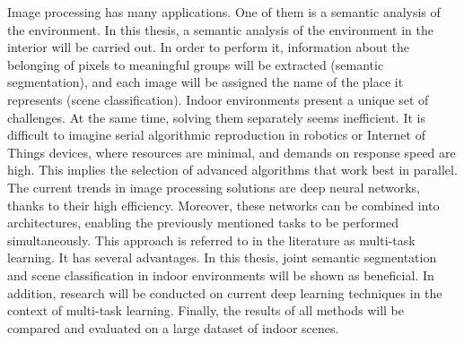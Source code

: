 Image processing has many applications. One of them is a semantic analysis of the environment. In this thesis, a semantic analysis of the environment in the interior will be carried out. In order to perform it, information about the belonging of pixels to meaningful groups will be extracted (semantic segmentation), and each image will be assigned the name of the place it represents (scene classification). Indoor environments present a unique set of challenges. At the same time, solving them separately seems inefficient. It is difficult to imagine serial algorithmic reproduction in robotics or Internet of Things devices, where resources are minimal, and demands on response speed are high. This implies the selection of advanced algorithms that work best in parallel. The current trends in image processing solutions are deep neural networks, thanks to their high efficiency. Moreover, these networks can be combined into architectures, enabling the previously mentioned tasks to be performed simultaneously. This approach is referred to in the literature as multi-task learning. It has several advantages. In this thesis, joint semantic segmentation and scene classification in indoor environments will be shown as beneficial. In addition, research will be conducted on current deep learning techniques in the context of multi-task learning. Finally, the results of all methods will be compared and evaluated on a large dataset of indoor scenes.